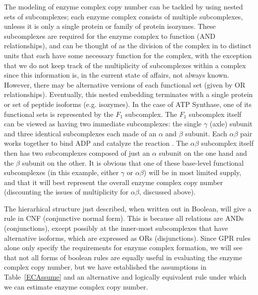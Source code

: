 The modeling of enzyme complex copy number can be tackled by using
nested sets of subcomplexes; each enzyme complex consists of multiple
subcomplexes, unlesss it is only a single protein or family of protein
isozymes.  These subcomplexes are required for the enzyme complex to
function (AND relationships), and can be thought of as the division of
the complex in to distinct units that each have some necessary
function for the complex, with the exception that we do not keep track
of the multiplicity of subcomplexes within a complex since this
information is, in the current state of affairs, not always known.
However, there may be alternative versions of each functional set
(given by OR relationships). Eventually, this nested embedding
terminates with a single protein or set of peptide isoforms
(e.g. isozymes).  In the case of ATP Synthase, one of its functional
sets is represented by the $F_1$ subcomplex. The $F_1$ subcomplex
itself can be viewed as having two immediate subcomplexes: the single
$\gamma$ (axle) subunit and three identical subcomplexes each made of
an $\alpha$ and $\beta$ subunit. Each $\alpha\beta$ pair works
together to bind ADP and catalyze the reaction \citep{Oster2003}. The
$\alpha\beta$ subcomplex itself then has two subcomplexes composed of
just an $\alpha$ subunit on the one hand and the $\beta$ subunit on
the other.  It is obvious that one of these base-level functional
subcomplexes (in this example, either $\gamma$ or $\alpha\beta$) will
be in most limited supply, and that it will best represent the overall
enzyme complex copy number (discounting the issues of multiplicity for
$\alpha\beta$, discussed above).

%
%

The hierarhical structure just described, when written out in Boolean,
will give a rule in CNF (conjunctive normal form). This is because all
relations are ANDs (conjunctions), except possibly at the inner-most
subcomplexes that have alternative isoforms, which are expressed as
ORs (disjunctions). Since GPR rules alone only specify the
requirements for enzyme complex formation, we will see that not all
forms of boolean rules are equally useful in evaluating the enzyme
complex copy number, but we have established the assumptions in
Table~\ref{ECAssume} and an alternative and logically equivalent rule
\citep{Russell2009} under which we can estimate enzyme complex copy
number.


